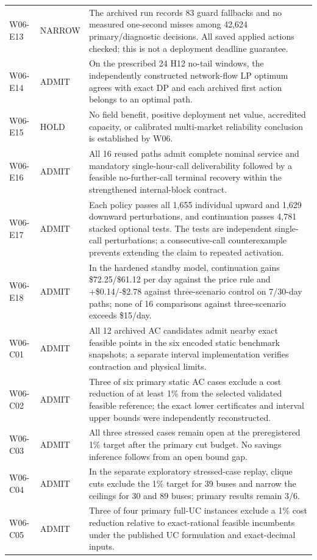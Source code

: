 \documentclass[11pt,letterpaper]{article}
\begin{document}
\begin{longtable}{P{.12\linewidth}P{.12\linewidth}P{.66\linewidth}}
W06-E13 & NARROW & The archived run records 83 guard fallbacks and no measured one-second misses among 42,624 primary/diagnostic decisions. All saved applied actions checked; this is not a deployment deadline guarantee.\\
W06-E14 & ADMIT & On the prescribed 24 H12 no-tail windows, the independently constructed network-flow LP optimum agrees with exact DP and each archived first action belongs to an optimal path.\\
W06-E15 & HOLD & No field benefit, positive deployment net value, accredited capacity, or calibrated multi-market reliability conclusion is established by W06.\\
W06-E16 & ADMIT & All 16 reused paths admit complete nominal service and mandatory single-hour-call deliverability followed by a feasible no-further-call terminal recovery within the strengthened internal-block contract.\\
W06-E17 & ADMIT & Each policy passes all 1,655 individual upward and 1,629 downward perturbations, and continuation passes 4,781 stacked optional tests. The tests are independent single-call perturbations; a consecutive-call counterexample prevents extending the claim to repeated activation.\\
W06-E18 & ADMIT & In the hardened standby model, continuation gains \$72.25/\$61.12 per day against the price rule and +\$0.14/-\$2.78 against three-scenario control on 7/30-day paths; none of 16 comparisons against three-scenario exceeds \$15/day.\\
W06-C01 & ADMIT & All 12 archived AC candidates admit nearby exact feasible points in the six encoded static benchmark snapshots; a separate interval implementation verifies contraction and physical limits.\\
W06-C02 & ADMIT & Three of six primary static AC cases exclude a cost reduction of at least 1\% from the selected validated feasible reference; the exact lower certificates and interval upper bounds were independently reconstructed.\\
W06-C03 & ADMIT & All three stressed cases remain open at the preregistered 1\% target after the primary cut budget. No savings inference follows from an open bound gap.\\
W06-C04 & ADMIT & In the separate exploratory stressed-case replay, clique cuts exclude the 1\% target for 39 buses and narrow the ceilings for 30 and 89 buses; primary results remain 3/6.\\
W06-C05 & ADMIT & Three of four primary full-UC instances exclude a 1\% cost reduction relative to exact-rational feasible incumbents under the published UC formulation and exact-decimal inputs.\\

\end{longtable}
\end{document}
